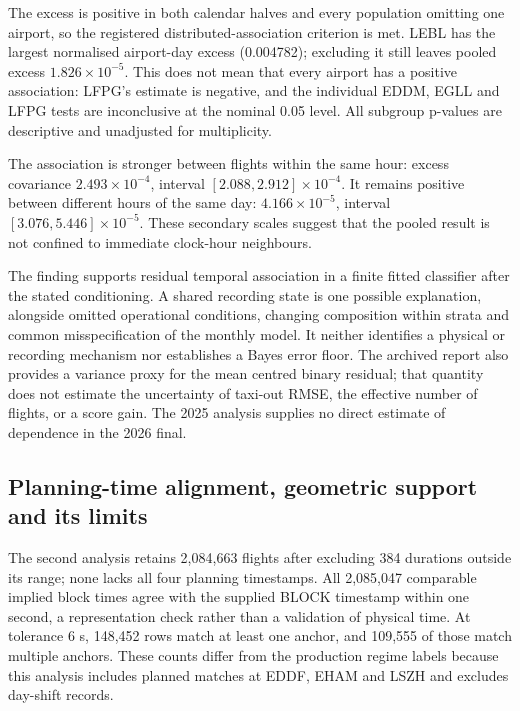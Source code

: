 \documentclass[11pt,a4paper]{article}
\begin{document}
The excess is positive in both calendar halves and every population omitting one airport, so the registered distributed-association criterion is met. LEBL has the largest normalised airport-day excess (0.004782); excluding it still leaves pooled excess \(1.826\times10^{-5}\). This does not mean that every airport has a positive association: LFPG's estimate is negative, and the individual EDDM, EGLL and LFPG tests are inconclusive at the nominal 0.05 level. All subgroup p-values are descriptive and unadjusted for multiplicity.

The association is stronger between flights within the same hour: excess covariance \(2.493\times10^{-4}\), interval \([2.088,2.912]\times10^{-4}\). It remains positive between different hours of the same day: \(4.166\times10^{-5}\), interval \([3.076,5.446]\times10^{-5}\). These secondary scales suggest that the pooled result is not confined to immediate clock-hour neighbours.

The finding supports residual temporal association in a finite fitted classifier after the stated conditioning. A shared recording state is one possible explanation, alongside omitted operational conditions, changing composition within strata and common misspecification of the monthly model. It neither identifies a physical or recording mechanism nor establishes a Bayes error floor. The archived report also provides a variance proxy for the mean centred binary residual; that quantity does not estimate the uncertainty of taxi-out RMSE, the effective number of flights, or a score gain. The 2025 analysis supplies no direct estimate of dependence in the 2026 final.

\subsection{Planning-time alignment, geometric support and its limits}\label{planning-time-alignment-geometric-support-and-its-limits}

The second analysis retains 2,084,663 flights after excluding 384 durations outside its range; none lacks all four planning timestamps. All 2,085,047 comparable implied block times agree with the supplied BLOCK timestamp within one second, a representation check rather than a validation of physical time. At tolerance 6 s, 148,452 rows match at least one anchor, and 109,555 of those match multiple anchors. These counts differ from the production regime labels because this analysis includes planned matches at EDDF, EHAM and LSZH and excludes day-shift records.
\end{document}
